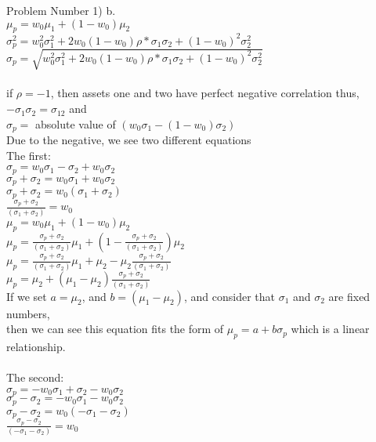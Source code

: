 \documentclass[11pt]{article}
\begin{document}
Problem Number 1) b.\\

$\mu_{p} = w_{0}\mu_{1} + (1-w_{0})\mu_{2}$\\
$\sigma^{2}_{p} = w^{2}_{0}\sigma^{2}_{1} + 2w_{0}(1 - w_{0})\rho*\sigma_{1}\sigma_{2} + (1 - w_{0})^{2} \sigma^{2}_{2}$\\
$\sigma_{p} = \sqrt{w^{2}_{0}\sigma^{2}_{1} + 2w_{0}(1 - w_{0})\rho*\sigma_{1}\sigma_{2} + (1 - w_{0})^{2} \sigma^{2}_{2}}$\\
\\
if $\rho = -1$, then assets one and two have perfect negative correlation thus, $-\sigma_{1}\sigma_{2} = \sigma_{1 2}$ and\\
$\sigma_{p} =$ absolute value of $(w_{0}\sigma_{1} - (1 - w_{0})\sigma_{2})$\\
Due to the negative, we see two different equations\\
The first:\\
$\sigma_{p} = w_{0}\sigma_{1} - \sigma_{2} + w_{0}\sigma_{2}$\\
$\sigma_{p} + \sigma_{2} = w_{0}\sigma_{1} + w_{0}\sigma_{2}$\\
$\sigma_{p} + \sigma_{2} = w_{0}(\sigma_{1} + \sigma_{2})$\\
$\frac{\sigma_{p} + \sigma_{2}}{(\sigma_{1} + \sigma_{2})} = w_{0}$\\

$\mu_{p} = w_{0}\mu_{1} + (1-w_{0})\mu_{2}$\\
$\mu_{p} = \frac{\sigma_{p} + \sigma_{2}}{(\sigma_{1} + \sigma_{2})}\mu_{1} + (1-\frac{\sigma_{p} + \sigma_{2}}{(\sigma_{1} + \sigma_{2})})\mu_{2}$\\
$\mu_{p} = \frac{\sigma_{p} + \sigma_{2}}{(\sigma_{1} + \sigma_{2})}\mu_{1} + \mu_{2} - \mu_{2}\frac{\sigma_{p} + \sigma_{2}}{(\sigma_{1} + \sigma_{2})}$\\
$\mu_{p} = \mu_{2} + (\mu_{1} - \mu_{2})\frac{\sigma_{p} + \sigma_{2}}{(\sigma_{1} + \sigma_{2})}$\\
If we set $a = \mu_{2}$, and $b = (\mu_{1} - \mu_{2})$, and consider that $\sigma_{1}$ and $\sigma_{2}$ are fixed numbers,\\
then we can see this equation fits the form of $\mu_{p} = a + b\sigma_{p}$ which is a linear relationship.\\
\\
The second:\\
$\sigma_{p} = -w_{0}\sigma_{1} + \sigma_{2} - w_{0}\sigma_{2}$\\
$\sigma_{p} - \sigma_{2} = -w_{0}\sigma_{1} - w_{0}\sigma_{2}$\\
$\sigma_{p} - \sigma_{2} = w_{0}(-\sigma_{1} - \sigma_{2})$\\
$\frac{\sigma_{p} - \sigma_{2}}{(-\sigma_{1} - \sigma_{2})} = w_{0}$\\
\end{document}
